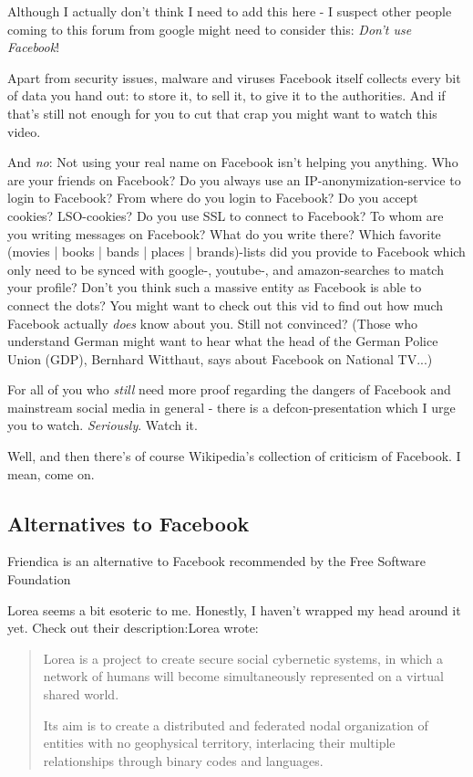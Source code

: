 \documentclass{article}
\begin{document}
 Although I actually don't think I need to add this here - I suspect other people coming to this forum from google might need to consider this: \emph{Don't use Facebook}! 


 Apart from security issues, malware and viruses Facebook itself collects every bit of data you hand out: to store it, to sell it, to give it to the authorities. And if that's still not enough for you to cut that crap you might want to watch this video.


 And \emph{no}: Not using your real name on Facebook isn't helping you anything. Who are your friends on Facebook? Do you always use an IP-anonymization-service to login to Facebook? From where do you login to Facebook? Do you accept cookies? LSO-cookies? Do you use SSL to connect to Facebook? To whom are you writing messages on Facebook? What do you write there? Which favorite (movies | books | bands | places | brands)-lists did you provide to Facebook which only need to be synced with google-, youtube-, and amazon-searches to match your profile? Don't you think such a massive entity as Facebook is able to connect the dots? You might want to check out this vid to find out how much Facebook actually \emph{does} know about you. Still not convinced? (Those who understand German might want to hear what the head of the German Police Union (GDP), Bernhard Witthaut, says about Facebook on National TV...)


 For all of you who \emph{still} need more proof regarding the dangers of Facebook and mainstream social media in general - there is a defcon-presentation which I urge you to watch. \emph{Seriously}. Watch it.


 Well, and then there's of course Wikipedia's collection of criticism of Facebook. I mean, come on.
\subsection{Alternatives to Facebook}


 Friendica is an alternative to Facebook recommended by the Free Software Foundation


 Lorea seems a bit esoteric to me. Honestly, I haven't wrapped my head around it yet. Check out their description:{\sc Lorea wrote:}\begin{quotation}


 Lorea is a project to create secure social cybernetic systems, in which a network of humans will become simultaneously represented on a virtual shared world.


 Its aim is to create a distributed and federated nodal organization of entities with no geophysical territory, interlacing their multiple relationships through binary codes and languages.\end{quotation}
\end{document}
